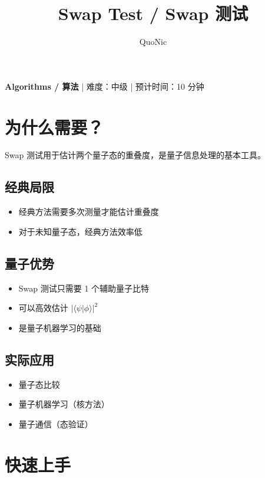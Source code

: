 \documentclass[12pt,a4paper]{article}
\title{Swap Test / Swap 测试}
\author{QuoNic}
\date{}
\begin{document}
\maketitle

\begin{center}
\textbf{Algorithms / 算法} | 难度：中级 | 预计时间：10 分钟
\end{center}

\tableofcontents
\newpage

\section{为什么需要？}

Swap 测试用于估计两个量子态的重叠度，是量子信息处理的基本工具。

\subsection{经典局限}
\begin{itemize}
  \item 经典方法需要多次测量才能估计重叠度
  \item 对于未知量子态，经典方法效率低
\end{itemize}

\subsection{量子优势}
\begin{itemize}
  \item Swap 测试只需要 1 个辅助量子比特
  \item 可以高效估计 $|\langle\psi|\phi\rangle|^2$
  \item 是量子机器学习的基础
\end{itemize}

\subsection{实际应用}
\begin{itemize}
  \item 量子态比较
  \item 量子机器学习（核方法）
  \item 量子通信（态验证）
\end{itemize}

\section{快速上手}
\end{document}
